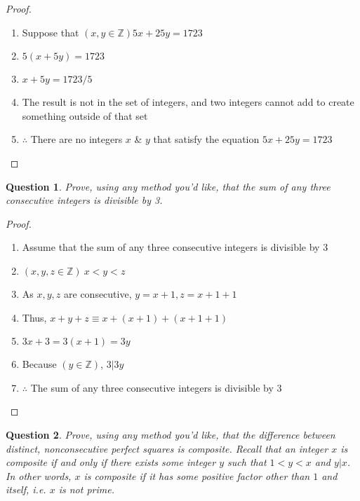 \documentclass[11pt,oneside]{article}
\newtheorem{question}{Question}
\begin{document}
\begin{proof}
    \begin{enumerate}
        \item Suppose that $(x, y \in \mathbb{Z}) 5x + 25y = 1723$
        \item $5(x + 5y) = 1723$
        \item $x + 5y = 1723/5$
        \item The result is not in the set of integers, and two integers cannot add to create something outside of that set
        \item $\therefore$ There are no integers $x$ \& $y$ that satisfy the equation  $5x + 25y = 1723$
    \end{enumerate}
\end{proof}

\bigskip

\begin{question}
    Prove, using any method you'd like, that the sum of any three consecutive integers is divisible by 3.
\end{question}

\begin{proof}
    \begin{enumerate}
        \item Assume that the sum of any three consecutive integers is divisible by 3
        \item $(x,y,z \in \mathbb{Z}) \  x < y < z$
        \item As $x, y, z$ are consecutive, $y = x + 1, z = x + 1 + 1$
        \item Thus, $x + y + z \equiv x + (x + 1) + (x + 1 + 1)$
        \item $3x + 3 = 3(x + 1) = 3y$
        \item Because $(y \in \mathbb{Z})$, $3|3y$
        \item $\therefore$ The sum of any three consecutive integers is divisible by 3
    \end{enumerate}
\end{proof}

\bigskip

\begin{question}
    Prove, using any method you'd like, that the difference between distinct, nonconsecutive perfect squares is composite. Recall that an integer $x$ is composite if and only if there exists some integer $y$ such that $1 < y < x$ and $y|x$. In other words, $x$ is composite if it has some positive factor other than $1$ and itself, i.e. $x$ is not prime.
\end{question}
\end{document}
